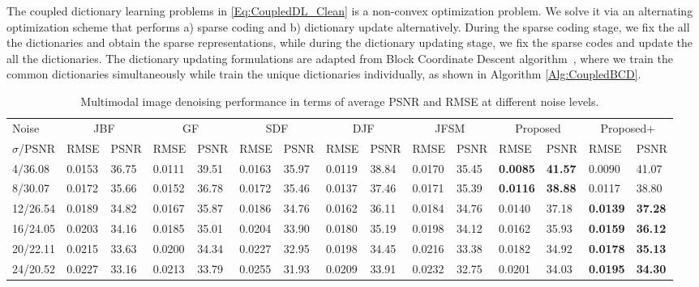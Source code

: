 \documentclass{article}
\begin{document}
The coupled dictionary learning problems in \eqref{Eq:CoupledDL_Clean} is a non-convex optimization problem. 
We solve it via an alternating optimization scheme that performs a) sparse coding and b) dictionary update alternatively. During the sparse coding stage, we fix the all the dictionaries and obtain the sparse representations, while during the dictionary updating stage, we fix the sparse codes and update the all the dictionaries. The dictionary updating formulations are adapted from Block Coordinate Descent algorithm~\cite{mairal2010online}, where we train the common dictionaries simultaneously while train the unique dictionaries individually, as shown in Algorithm \ref{Alg:CoupledBCD}.











\begin{table*}[t]
	\scriptsize
	\centering
	\caption{Multimodal image denoising performance in terms of average PSNR and RMSE at different noise levels.}
	\begin{tabular}{l| ll| ll| ll| ll| ll| ll |ll }
		\hline \hline
		Noise & \multicolumn{2}{c|}{JBF\cite{kopf2007joint}} & \multicolumn{2}{c|}{GF\cite{he2013guided}} & \multicolumn{2}{c|}{SDF\cite{ham2017robust}} & \multicolumn{2}{c|}{DJF\cite{li2016deep}} & \multicolumn{2}{c|}{JFSM\cite{shen2015multispectral}} & \multicolumn{2}{c|}{Proposed} & \multicolumn{2}{c}{Proposed+} \\
		$\sigma$/PSNR & RMSE & PSNR & RMSE & PSNR & RMSE & PSNR & RMSE & PSNR & RMSE & PSNR & RMSE & PSNR & RMSE & PSNR \\
		\hline
		4/36.08 & 0.0153 & 36.75 & 0.0111 & 39.51 & 0.0163 & 35.97 & 0.0119 & 38.84 & 0.0170 & 35.45 & \textbf{0.0085} & \textbf{41.57} & 0.0090 & 41.07 \\
		8/30.07 & 0.0172 & 35.66 & 0.0152 & 36.78 & 0.0172 & 35.46 & 0.0137 & 37.46 & 0.0171 & 35.39 & \textbf{0.0116} & \textbf{38.88} & 0.0117 & 38.80 \\
		12/26.54 & 0.0189 & 34.82 & 0.0167 & 35.87 & 0.0186 & 34.76 & 0.0162 & 36.11 & 0.0184 & 34.76 & 0.0140 & 37.18 & \textbf{0.0139} & \textbf{37.28} \\
		16/24.05 & 0.0203 & 34.16 & 0.0185 & 35.01 & 0.0204 & 33.90 & 0.0180 & 35.19 & 0.0198 & 34.12 & 0.0162 & 35.93 & \textbf{0.0159} & \textbf{36.12} \\
		20/22.11 & 0.0215 & 33.63 & 0.0200 & 34.34 & 0.0227 & 32.95 & 0.0198 & 34.45 & 0.0216 & 33.38 & 0.0182 & 34.92 & \textbf{0.0178} & \textbf{35.13} \\
		24/20.52 & 0.0227 & 33.16 & 0.0213 & 33.79 & 0.0255 & 31.93 & 0.0209 & 33.91 & 0.0232 & 32.75 & 0.0201 & 34.03 & \textbf{0.0195} & \textbf{34.30} \\
		\hline \hline
	\end{tabular}
	\label{Tab:PSNR_RMSE}
\end{table*}
\end{document}
